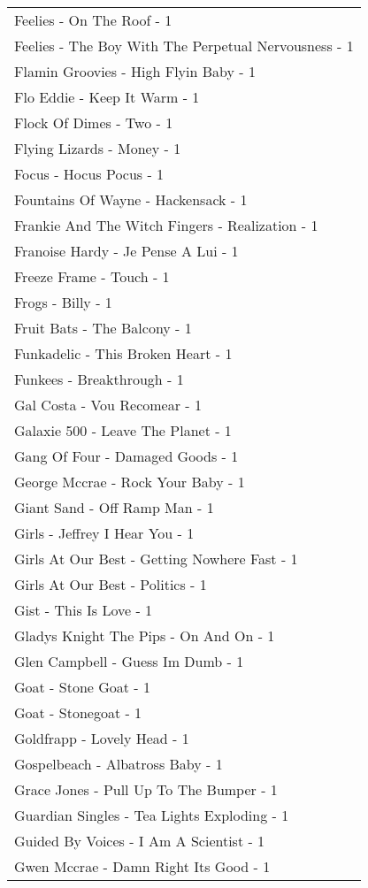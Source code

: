 \documentclass[
]{article}
\begin{document}
\begin{longtable}{l}
Feelies - On The Roof - 1 \\ 
Feelies - The Boy With The Perpetual Nervousness - 1 \\ 
Flamin Groovies - High Flyin Baby - 1 \\ 
Flo Eddie - Keep It Warm - 1 \\ 
Flock Of Dimes - Two - 1 \\ 
Flying Lizards - Money - 1 \\ 
Focus - Hocus Pocus - 1 \\ 
Fountains Of Wayne - Hackensack - 1 \\ 
Frankie And The Witch Fingers - Realization - 1 \\ 
Franoise Hardy - Je Pense A Lui - 1 \\ 
Freeze Frame - Touch - 1 \\ 
Frogs - Billy - 1 \\ 
Fruit Bats - The Balcony - 1 \\ 
Funkadelic - This Broken Heart - 1 \\ 
Funkees - Breakthrough - 1 \\ 
Gal Costa - Vou Recomear - 1 \\ 
Galaxie 500 - Leave The Planet - 1 \\ 
Gang Of Four - Damaged Goods - 1 \\ 
George Mccrae - Rock Your Baby - 1 \\ 
Giant Sand - Off Ramp Man - 1 \\ 
Girls - Jeffrey I Hear You - 1 \\ 
Girls At Our Best - Getting Nowhere Fast - 1 \\ 
Girls At Our Best - Politics - 1 \\ 
Gist - This Is Love - 1 \\ 
Gladys Knight The Pips - On And On - 1 \\ 
Glen Campbell - Guess Im Dumb - 1 \\ 
Goat - Stone Goat - 1 \\ 
Goat - Stonegoat - 1 \\ 
Goldfrapp - Lovely Head - 1 \\ 
Gospelbeach - Albatross Baby - 1 \\ 
Grace Jones - Pull Up To The Bumper - 1 \\ 
Guardian Singles - Tea Lights Exploding - 1 \\ 
Guided By Voices - I Am A Scientist - 1 \\ 
Gwen Mccrae - Damn Right Its Good - 1 \\ 

\end{longtable}
\end{document}
